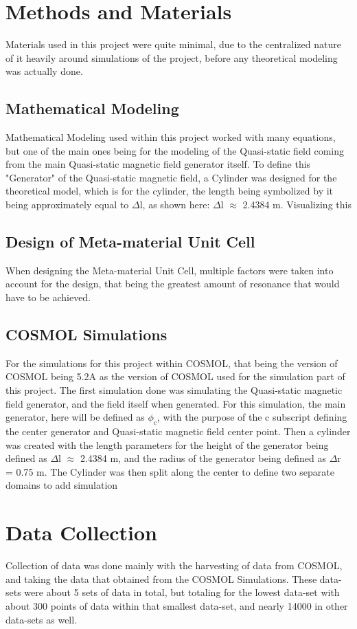 \documentclass[]{article}
\begin{document}
\section{Methods and Materials} 
Materials used in this project were quite minimal, due to the centralized nature of it heavily around simulations of the project, before any theoretical modeling was actually done.
\subsection{Mathematical Modeling}
Mathematical Modeling used within this project worked with many equations, but one of the main ones being for the modeling of the Quasi-static field coming from the main Quasi-static magnetic field generator itself. To define this "Generator" of the Quasi-static magnetic field, a Cylinder was designed for the theoretical model, which is for the cylinder, the length being symbolized by it being approximately equal to $\Delta$l, as shown here: $\Delta$l $\approx$ 2.4384 m. Visualizing this 
\subsection{Design of Meta-material Unit Cell}
When designing the Meta-material Unit Cell, multiple factors were taken into account for the design, that being the greatest amount of resonance that would have to be achieved. 
\subsection{COSMOL Simulations}
For the simulations for this project within COSMOL, that being the version of COSMOL being 5.2A as the version of COSMOL used for the simulation part of this project. The first simulation done was simulating the Quasi-static magnetic field generator, and the field itself when generated. For this simulation, the main generator, here will be defined as $\phi_c$, with the purpose of the c subscript defining the center generator and Quasi-static magnetic field center point. Then a cylinder was created with the length parameters for the height of the generator being defined as $\Delta$l $\approx$ 2.4384 m, and the radius of the generator being defined as $\Delta$r = 0.75 m. The Cylinder was then split along the center to define two separate domains to add simulation 

\section{Data Collection}
Collection of data was done mainly with the harvesting of data from COSMOL, and taking the data that obtained from the COSMOL Simulations. These data-sets were about 5 sets of data in total, but totaling for the lowest data-set with about 300 points of data within that smallest data-set, and nearly 14000 in other data-sets as well.
\end{document}
